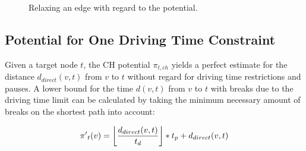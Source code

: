 \begin{figure}[hbtp]
	\setlength{\interspacetitleruled}{0pt}%
	\setlength{\algotitleheightrule}{0pt}%
	\begin{algorithm*}[H]
		\DontPrintSemicolon



	\end{algorithm*}
	\setlength{\interspacetitleruled}{2pt}%
	\setlength{\algotitleheightrule}{\algotitleheightruledefault}%

	\caption{\label{alg:relax_edge_a_star} Relaxing an edge with regard to the potential.}
\end{figure}

\subsection{Potential for One Driving Time Constraint}\label{section:potential_csp}
Given a target node $t$, the CH potential $\pi_{t,ch}$ yields a perfect estimate for the distance $d_{direct}(v,t)$ from $v$ to $t$ without regard for driving time restrictions and pauses. A lower bound for the time $d(v,t)$ from $v$ to $t$ with breaks due to the driving time limit can be calculated by taking the minimum necessary amount of breaks on the shortest path into account:

\[\pi{'}_t(v) = \floor*{ \frac{d_{direct}(v,t)}{t_d} } * t_p + d_{direct}(v,t)\]

